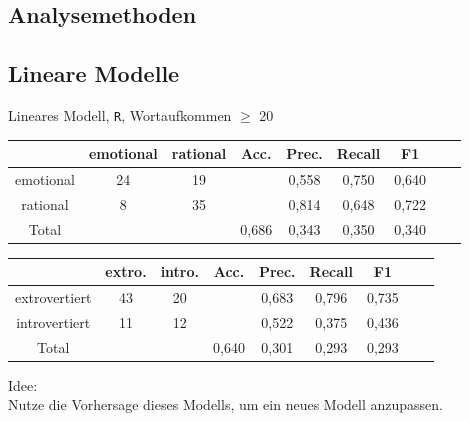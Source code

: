 \begin{frame}
\section{Analysemethoden}
\subsection{Lineare Modelle}
Lineares Modell, \texttt{R}, Wortaufkommen $\geq$ 20\\
\vspace{12pt}
\begin{center}
\begin{tabular}{|c|c|c|c|c|c|c|c|c|}
\hline
				& emotional 	& rational	&  Acc.	& Prec. & Recall	& F1\\
\hline
emotional 		& 24			& 19 		&       & 0,558	& 0,750 	& 0,640\\
rational	 	& 8 			& 35		& 		& 0,814	& 0,648 	& 0,722\\
\hline
Total 			& 				& 			& 0,686	& 0,343	& 0,350  	& 0,340\\
\hline
\end{tabular}
\end{center}

\begin{center}
\begin{tabular}{|c|c|c|c|c|c|c|c|c|}
\hline
				& extro. 	& intro.	&  Acc.	& Prec. 	& Recall	& F1\\
\hline
extrovertiert	& 43		& 20		&       & 0,683 	& 0,796 	& 0,735\\
introvertiert 	& 11 		& 12		& 		& 0,522 	& 0,375 	& 0,436\\
\hline
Total 			& 			& 			& 0,640	& 0,301		& 0,293  	& 0,293\\
\hline
\end{tabular}
 \end{center}

 \vspace{12pt}
 
 Idee:\\
 Nutze die Vorhersage dieses Modells, um ein neues Modell anzupassen. 
 \end{frame}


